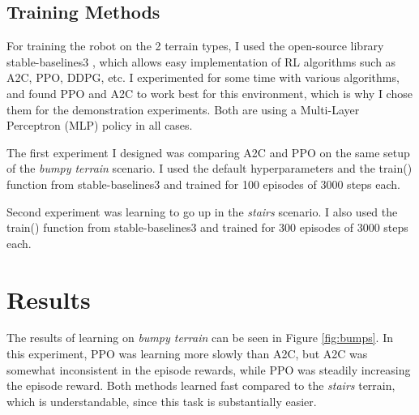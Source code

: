 \documentclass{article}
\begin{document}
\subsection{Training Methods}
For training the robot on the 2 terrain types, I used the open-source library stable-baselines3 \cite{stable-baselines3}, which allows easy implementation of RL algorithms such as A2C, PPO, DDPG, etc.
I experimented for some time with various algorithms, and found PPO and A2C to work best for this environment, which is why I chose them for the demonstration experiments.
Both are using a Multi-Layer Perceptron (MLP) policy in all cases.

The first experiment I designed was comparing A2C and PPO on the same setup of the \textit{bumpy terrain} scenario.
I used the default hyperparameters and the train() function from stable-baselines3 and trained for 100 episodes of 3000 steps each.

Second experiment was learning to go up in the \textit{stairs} scenario. 
I also used the train() function from stable-baselines3 and trained for 300 episodes of 3000 steps each.

\section{Results}
The results of learning on \textit{bumpy terrain} can be seen in Figure \ref{fig:bumps}.
In this experiment, PPO was learning more slowly than A2C, but A2C was somewhat inconsistent in the episode rewards, while PPO was steadily increasing the episode reward.
Both methods learned fast compared to the \textit{stairs} terrain, which is understandable, since this task is substantially easier.
\end{document}
